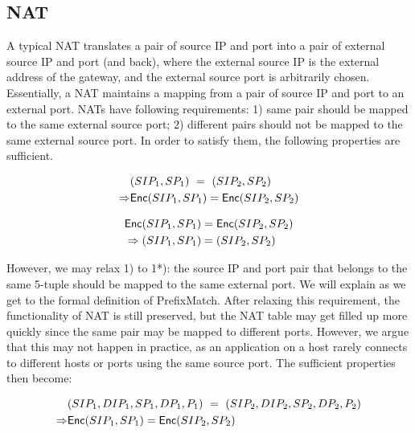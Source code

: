 \subsection{NAT}
A typical NAT translates a pair of source IP and port into a pair of
external source IP and port (and back), where the external source IP is the external address of the gateway,
and the external source port is arbitrarily chosen. Essentially, a NAT maintains a mapping from a pair of source IP
and port to an external port. NATs have following requirements: 
1) same pair should be mapped to the same external source port; 
2) different pairs should not be mapped to the same external source port. 
In order to satisfy them, the following properties are sufficient.

\begin{equation}
\begin{split}
& (SIP_1, SP_1)\ =\ (SIP_2, SP_2) \\ 
 \Rightarrow & \mathsf{Enc}(SIP_1, SP_1) = \mathsf{Enc}(SIP_2, SP_2) 
\end{split}
\end{equation}

\begin{equation}
\begin{split}
& \mathsf{Enc}(SIP_1, SP_1) = \mathsf{Enc}(SIP_2, SP_2) \\
& \Rightarrow (SIP_1, SP_1) = (SIP_2, SP_2) 
\end{split}
\end{equation}

However, we may relax 1) to 1*): the source IP and port pair that belongs to the same 5-tuple 
should be mapped to the same external port. We will explain as we get to the
formal definition of PrefixMatch. After relaxing this requirement, the functionality of NAT is still preserved,
but the NAT table may get filled up more quickly since the same pair may be mapped to different ports. However,
we argue that this may not happen in practice, as an application on a host rarely connects to different hosts 
or ports using the same source port. The sufficient properties then become:

\begin{equation}
\label{eqn:nat1}
\begin{split}
& (SIP_1, DIP_1, SP_1, DP_1, P_1)\ =\ (SIP_2, DIP_2, SP_2, DP_2, P_2) \\
\Rightarrow & \mathsf{Enc}(SIP_1, SP_1) = \mathsf{Enc}(SIP_2, SP_2) \\
\end{split}
\end{equation}

